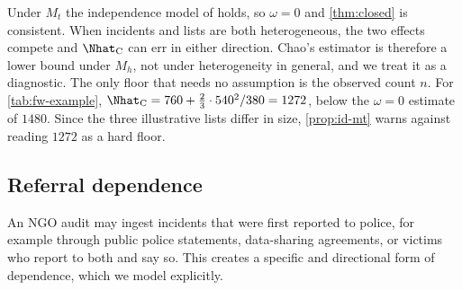 Under $M_t$ the independence model of \citet{darroch1958} holds, so $\omega=0$ and \cref{thm:closed} is consistent. When incidents and lists are both heterogeneous, the two effects compete and $\Nhat_{\mathrm C}$ can err in either direction. Chao's estimator is therefore a lower bound under $M_h$, not under heterogeneity in general, and we treat it as a diagnostic. The only floor that needs no assumption is the observed count $n$. For \cref{tab:fw-example}, $\Nhat_{\mathrm C}=760+\tfrac23\cdot540^2/380=1272$, below the $\omega=0$ estimate of $1480$. Since the three illustrative lists differ in size, \cref{prop:id-mt} warns against reading $1272$ as a hard floor.

\subsection{Referral dependence}\label{sec:id-referral}

An NGO audit may ingest incidents that were first reported to police, for example through public police statements, data-sharing agreements, or victims who report to both and say so. This creates a specific and directional form of dependence, which we model explicitly.

